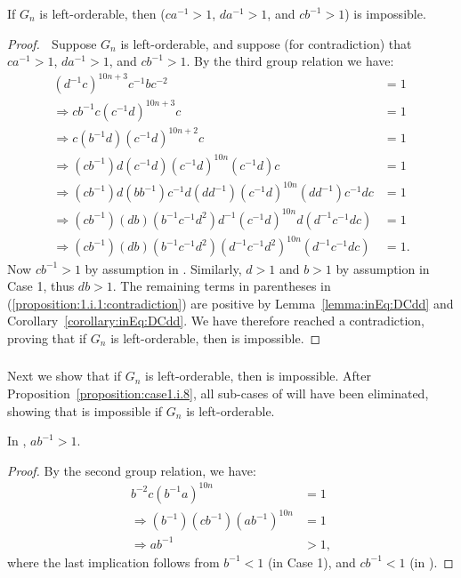 \begin{proposition} If $G_n$ is left-orderable, then  ($ca^{-1}>1$, $da^{-1}>1$, and $cb^{-1}>1$) is impossible.
\end{proposition}
\begin{proof} $\;$ Suppose $G_n$ is left-orderable, and suppose (for contradiction) that $ca^{-1}>1$, $da^{-1}>1$, and $cb^{-1}>1$. By the third group relation we have:
\begin{align}
(d^{-1}c)^{10n+3}c^{-1}bc^{-2}&=1\nonumber{}\\
\Rightarrow{}cb^{-1}c(c^{-1}d)^{10n+3}c&=1\nonumber{}\\
\Rightarrow{}c(b^{-1}d)(c^{-1}d)^{10n+2}c&=1\nonumber{}\\
\Rightarrow{}(cb^{-1})d(c^{-1}d)(c^{-1}d)^{10n}(c^{-1}d)c&=1\nonumber{}\\
\Rightarrow{}(cb^{-1})d(bb^{-1})c^{-1}d(dd^{-1})(c^{-1}d)^{10n}(dd^{-1})c^{-1}dc&=1\nonumber{}\\
\Rightarrow{}(cb^{-1})(db)(b^{-1}c^{-1}d^{2})d^{-1}(c^{-1}d)^{10n}d(d^{-1}c^{-1}dc)&=1\nonumber{}\\
\Rightarrow{}(cb^{-1})(db)(b^{-1}c^{-1}d^{2})(d^{-1}c^{-1}d^{2})^{10n}(d^{-1}c^{-1}dc)&=1.\label{proposition:1.i.1:contradiction}
\end{align}
Now $cb^{-1}>1$ by assumption in . Similarly, $d>1$ and $b>1$ by assumption in Case 1, thus $db>1$. The remaining terms in parentheses in (\ref{proposition:1.i.1:contradiction}) are positive by Lemma~\ref{lemma:inEq:DCdd} and Corollary~\ref{corollary:inEq:DCdd}. We have therefore reached a contradiction, proving that if $G_n$ is left-orderable, then  is impossible.
\end{proof}


\subsubsection{}

\noindent{}Next we show that if $G_n$ is left-orderable, then  is impossible. After Proposition~\ref{proposition:case1.i.8}, all sub-cases of  will have been eliminated, showing that  is impossible if $G_n$ is left-orderable.

\begin{lemma} In , $ab^{-1}>1$.
\label{eq8iL}
\end{lemma}
\begin{proof} By the second group relation, we have:
\begin{align*}
b^{-2}c(b^{-1}a)^{10n}&=1\\
\Rightarrow{}(b^{-1})(cb^{-1})(ab^{-1})^{10n}&=1\\
\Rightarrow{}ab^{-1}&>1,
\end{align*}
where the last implication follows from $b^{-1}<1$ (in Case 1), and $cb^{-1}<1$ (in ).
\end{proof}

